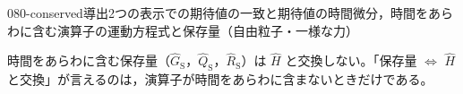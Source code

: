 \documentclass[uplatex,dvipdfmx,a4paper,11pt]{jsarticle}
\begin{document}
\begin{mondai}{080-conserved}{導出}{2つの表示での期待値の一致と期待値の時間微分，時間をあらわに含む演算子の運動方程式と保存量（自由粒子・一様な力）}
\begin{tadashii}
\tsumazuki 時間をあらわに含む保存量（$\hat{G}_{\mathrm{S}}$，$\hat{Q}_{\mathrm{S}}$，$\hat{R}_{\mathrm{S}}$）は $\hat{H}$ と交換しない。「保存量 $\Leftrightarrow$ $\hat{H}$ と交換」が言えるのは，演算子が時間をあらわに含まないときだけである。
\end{tadashii}
\end{mondai}

\noteowari
\end{document}

